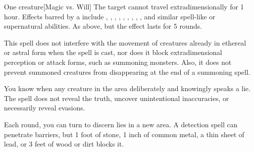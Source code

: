 \begin{spellheader}
    \spellrng{\rngmed}
\end{spellheader}
\begin{spelleffects}
    \begin{spelltarget}{One creature}[Magic vs. Will]
        \spellsuccess  The target cannot travel extradimensionally for 1 hour. Effects barred by a  include , , , , , , , , , and similar spell-like or supernatural abilities.
        \spellfailure As above, but the effect lasts for 5 rounds.
    \end{spelltarget}
\end{spelleffects}
\begin{spellfooter}
    \spellnotes This spell does not interfere with the movement of creatures already in ethereal or astral form when the spell is cast, nor does it block extradimensional perception or attack forms, such as summoning monsters. Also, it does not prevent summoned creatures from disappearing at the end of a summoning spell.
\end{spellfooter}

\begin{spellheader}
\end{spellheader}
\begin{spelleffects}
    \spellline
    \spelleffect You know when any creature in the area deliberately and knowingly speaks a lie. The spell does not reveal the truth, uncover unintentional inaccuracies, or necessarily reveal evasions.
\end{spelleffects}
\begin{spellfooter}
    \spellnotes Each round, you can turn to discern lies in a new area. A detection spell can penetrate barriers, but 1 foot of stone, 1 inch of common metal, a thin sheet of lead, or 3 feet of wood or dirt blocks it.
\end{spellfooter}

